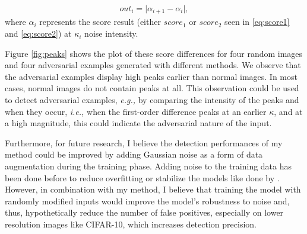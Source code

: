 \begin{align}
    \label{eq:first-order-diff}
    out_i= \lvert \alpha_{i+1} - \alpha_{i} \rvert,
\end{align}
where $\alpha_i$ represents the score result (either $score_1$ or $score_2$ seen
in \ref{eq:score1} and \ref{eq:score2}) at $\kappa_i$ noise intensity.

Figure \ref{fig:peaks} shows the plot of these score differences for four random
images and four adversarial examples generated with different methods. We
observe that the adversarial examples display high peaks earlier than normal
images. In most cases, normal images do not contain peaks at all. This
observation could be used to detect adversarial examples, \emph{e.g.,} by
comparing the intensity of the peaks and when they occur, \emph{i.e.,} when the
first-order difference peaks at an earlier $\kappa$, and at a high magnitude,
this could indicate the adversarial nature of the input.

Furthermore, for future research, I believe the detection performances of my
method could be improved by adding Gaussian noise as a form of data augmentation
during the training phase. Adding noise to the training data has been done
before to reduce overfitting or stabilize the models like done by
\cite{zheng_improving_2016}. However, in combination with my method, I believe
that training the model with randomly modified inputs would improve the model's
robustness to noise and, thus, hypothetically reduce the number of false
positives, especially on lower resolution images like CIFAR-10, which increases
detection precision.